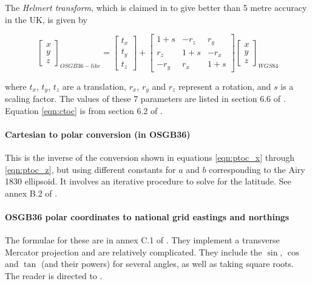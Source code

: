 \documentclass[10pt,a4paper]{article}
\begin{document}
The \textit{Helmert transform}, which is claimed in \cite{gcs} to give better
than 5 metre accuracy in the UK, is given by

\begin{equation}
  \left[ \begin{matrix}
    x \\ y \\ z
  \end{matrix}\right]_{OSGB36-like}
  =
  \left[ \begin{matrix}
    t_x \\ t_y \\ t_z
  \end{matrix}\right]
    +
  \left[ \begin{matrix}
      1+s & -r_z & r_y \\
      r_z & 1+s & -r_x \\
      -r_y & r_x  & 1+s
  \end{matrix}\right]
  \left[ \begin{matrix}
    x \\ y \\ z
  \end{matrix}\right]_{WGS84}
  \label{eqn:ctoc}
\end{equation}

where $t_x$, $t_y$, $t_z$ are a translation, $r_x$, $r_y$ and $r_z$ represent
a rotation, and $s$ is a scaling factor.  The values of these 7 parameters
are listed in section 6.6 of \cite{gcs}.  Equation \eqref{eqn:ctoc} is from
section 6.2 of \cite{gcs}.

\paragraph{Cartesian to polar conversion (in OSGB36)}
This is the inverse of the conversion shown in equations \eqref{eqn:ptoc_x}
through \eqref{eqn:ptoc_z}, but using different constants for $a$ and $b$
corresponding to the Airy 1830 ellipsoid.  It involves an iterative procedure
to solve for the latitude.  See annex B.2 of \cite{gcs}.

\paragraph{OSGB36 polar coordinates to national grid eastings and northings}
The formulae for these are in annex C.1 of \cite{gcs}.  They implement a
transverse Mercator projection and are relatively complicated.  They include
the $\sin$, $\cos$ and $\tan$ (and their powers) for several angles, as well as
taking square roots.  The reader is directed to \cite{gcs}.
\end{document}
